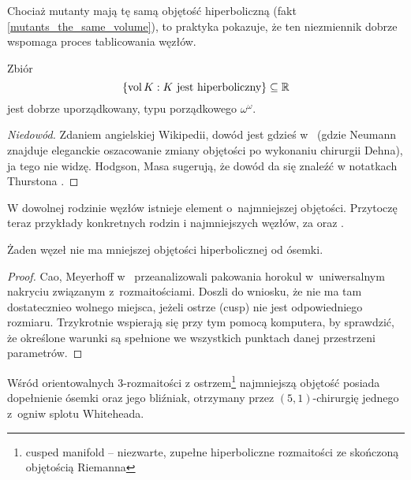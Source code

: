 Chociaż mutanty mają tę samą objętość hiperboliczną (fakt \ref{mutants_the_same_volume}), to praktyka pokazuje, że ten niezmiennik dobrze wspomaga proces tablicowania węzłów.

\begin{proposition}
    Zbiór
    \[
        \{\operatorname{vol} K: K \textrm{ jest hiperboliczny}\} \subseteq \mathbb R
    \]
    jest dobrze uporządkowany, typu porządkowego $\omega^\omega$.
\end{proposition}

\begin{proof}[Niedowód]
    Zdaniem angielskiej Wikipedii, dowód jest gdzieś w~\cite{neumann85} (gdzie Neumann znajduje eleganckie oszacowanie zmiany objętości po wykonaniu chirurgii Dehna), ja tego nie widzę.
    Hodgson, Masa \cite{hodgson13} sugerują, że dowód da się znaleźć w notatkach Thurstona \cite{thurston02}.
\end{proof}

W dowolnej rodzinie węzłów istnieje element o~najmniejszej objętości.
Przytoczę teraz przykłady konkretnych rodzin i najmniejszych węzłów, za \cite[s. 16-17]{purcell19} oraz \cite[s. 1-99]{hodgson13}.

\begin{proposition}
    Żaden węzeł nie ma mniejszej objętości hiperbolicznej od ósemki.
\end{proposition}

\begin{proof}
    Cao, Meyerhoff w~\cite{cao01} przeanalizowali pakowania horokul w~uniwersalnym nakryciu związanym z~rozmaitościami.
    Doszli do wniosku, że nie ma tam dostatecznieo wolnego miejsca, jeżeli ostrze (cusp) nie jest odpowiedniego rozmiaru.
    Trzykrotnie wspierają się przy tym pomocą komputera, by sprawdzić, że określone warunki są spełnione we wszystkich punktach danej przestrzeni parametrów.
\end{proof}

\begin{proposition}
    Wśród orientowalnych 3-rozmaitości z ostrzem\footnote{cusped manifold -- niezwarte, zupełne hiperboliczne rozmaitości ze skończoną objętością Riemanna} najmniejszą objętość posiada dopełnienie ósemki oraz jego bliźniak, otrzymany przez $(5, 1)$-chirurgię jednego z~ogniw splotu Whiteheada.
%
%
\end{proposition}

